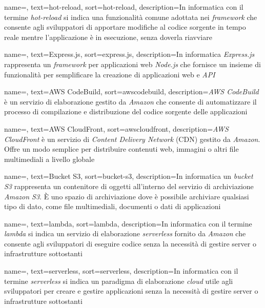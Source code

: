  {
    name=,
    text=hot-reload,
    sort=hot-reload,
    description={In informatica con il termine \emph{hot-reload} si indica una funzionalità comune adottata nei \emph{framework} che consente agli sviluppatori di apportare modifiche al codice sorgente
    in tempo reale mentre l'applicazione è in esecuzione, senza doverla riavviare}
}

 {
    name=,
    text=Express.js,
    sort=express.js,
    description={In informatica \emph{Express.js} rappresenta un \emph{framework} per applicazioni web \emph{Node.js} che fornisce un insieme di funzionalità per semplificare la creazione di applicazioni web e \emph{API}}
}


 {
    name=,
    text=AWS CodeBuild,
    sort=awscodebuild,
    description={\emph{AWS CodeBuild} è un servizio di elaborazione gestito da \emph{Amazon} che consente di automatizzare il processo di compilazione e distribuzione del codice sorgente delle applicazioni}
}

 {
    name=,
    text=AWS CloudFront,
    sort=awscloudfront,
    description={\emph{AWS CloudFront} è un servizio di \emph{Content Delivery Network} (CDN) gestito da \emph{Amazon}. Offre un modo semplice per distribuire contenuti web, immagini o altri file multimediali a livello globale}
}

 {
    name=,
    text=Bucket S3,
    sort=bucket-s3,
    description={In informatica un \emph{bucket S3} rappresenta un contenitore di oggetti all'interno del servizio di archiviazione \emph{Amazon S3}. È uno spazio di archiviazione dove è possibile archiviare qualsiasi tipo di dato, come file multimediali, documenti o dati di applicazioni}
}

 {
    name=,
    text=lambda,
    sort=lambda,
    description={In informatica con il termine \emph{lambda} si indica un servizio di elaborazione \emph{serverless} fornito da \emph{Amazon} che consente agli sviluppatori di eseguire codice senza la necessità di gestire server o infrastrutture sottostanti}
}

 {
    name=,
    text=serverless,
    sort=serverless,
    description={In informatica con il termine \emph{serverless} si indica un paradigma di elaborazione \emph{cloud} utile agli sviluppatori per creare e gestire applicazioni senza la necessità di gestire server o infrastrutture sottostanti}
}

